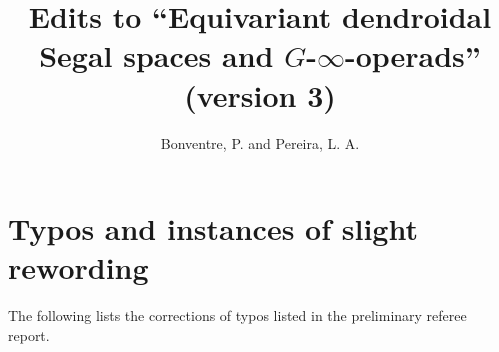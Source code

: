\documentclass{article}
\begin{document}
 
 
\title{Edits to ``Equivariant dendroidal Segal spaces and $G$-$\infty$-operads'' (version 3)
\\[12pt]} %
 
\author{Bonventre, P. and Pereira, L. A.}
 
\maketitle
 
 
 
 
\section{Typos and instances of slight rewording}
 
The following lists the corrections of typos listed in the preliminary referee report.
\end{document}
